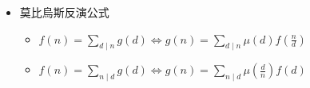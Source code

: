 \begin{itemize}



\item 莫比烏斯反演公式
\begin{itemize}
    \item $f(n)=\sum_{d\mid n}g(d)\Leftrightarrow g(n)=\sum_{d\mid n}\mu(d)f(\frac{n}{d})$
    \item $f(n)=\sum_{n\mid d}g(d)\Leftrightarrow g(n)=\sum_{n\mid d}\mu(\frac{d}{n})f(d)$
\end{itemize}


\end{itemize}
